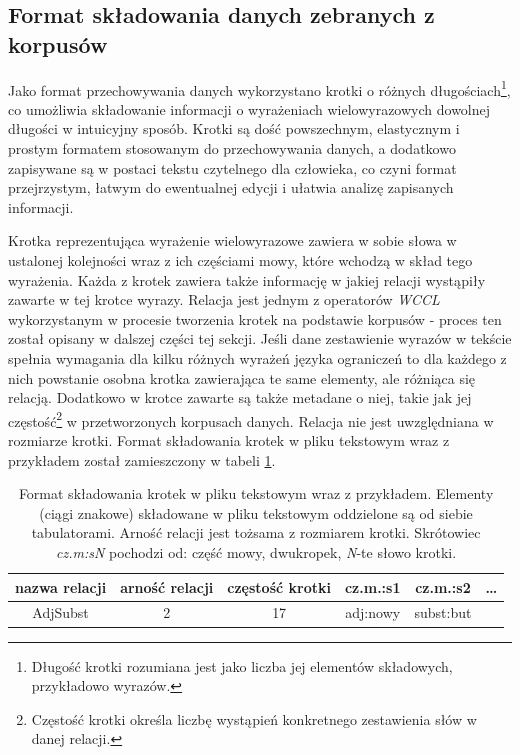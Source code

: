 \documentclass[11pt,a4paper]{llncs}
\begin{document}
\subsection{Format składowania danych zebranych z korpusów}
Jako format przechowywania danych wykorzystano krotki o różnych długościach\footnote{Długość krotki rozumiana jest jako liczba jej elementów składowych, przykładowo wyrazów.}, co umożliwia składowanie informacji o wyrażeniach wielowyrazowych dowolnej długości w intuicyjny sposób.
Krotki są dość powszechnym, elastycznym i prostym formatem stosowanym do przechowywania danych, a dodatkowo zapisywane są w postaci tekstu czytelnego dla człowieka, co czyni format przejrzystym, łatwym do ewentualnej edycji i ułatwia analizę zapisanych informacji.


Krotka reprezentująca wyrażenie wielowyrazowe zawiera w sobie słowa w ustalonej kolejności wraz z ich częściami mowy, które wchodzą w skład tego wyrażenia.
Każda z krotek zawiera także informację w jakiej relacji wystąpiły zawarte w tej krotce wyrazy.
Relacja jest jednym z operatorów \emph{WCCL} wykorzystanym w procesie tworzenia krotek na podstawie korpusów - proces ten został opisany w dalszej części tej sekcji.
Jeśli dane zestawienie wyrazów w tekście spełnia wymagania dla kilku różnych wyrażeń języka ograniczeń to dla każdego z nich powstanie osobna krotka zawierająca te same elementy, ale różniąca się relacją.
Dodatkowo w krotce zawarte są także metadane o niej, takie jak jej częstość\footnote{Częstość krotki określa liczbę wystąpień konkretnego zestawienia słów w danej relacji.} w przetworzonych korpusach danych.
Relacja nie jest uwzględniana w rozmiarze krotki.
Format składowania krotek w pliku tekstowym wraz z przykładem został zamieszczony w tabeli \ref{tuple_format}.

\begin{table}[h!]
\centering
\begin{tabular}{c|c|c|c|c|c}
\toprule
	\textbf{nazwa relacji} & 
		\textbf{arność relacji} & 
		\textbf{częstość krotki} & 
		\textbf{cz.m.:s1} & 
		\textbf{cz.m.:s2} & 
		\ldots \\
	\midrule
	AdjSubst & 2 & 17 & adj:nowy & subst:but & \\
\bottomrule
\end{tabular}
\caption[Format składowania krotek w pliku tekstowym]{Format składowania krotek w pliku tekstowym wraz z przykładem. Elementy (ciągi znakowe) składowane w pliku tekstowym oddzielone są od siebie tabulatorami. Arność relacji jest tożsama z rozmiarem krotki. Skrótowiec \emph{cz.m:sN} pochodzi od: część mowy, dwukropek, \emph{N}-te słowo krotki.}
\label{tuple_format}
\end{table}
\end{document}
